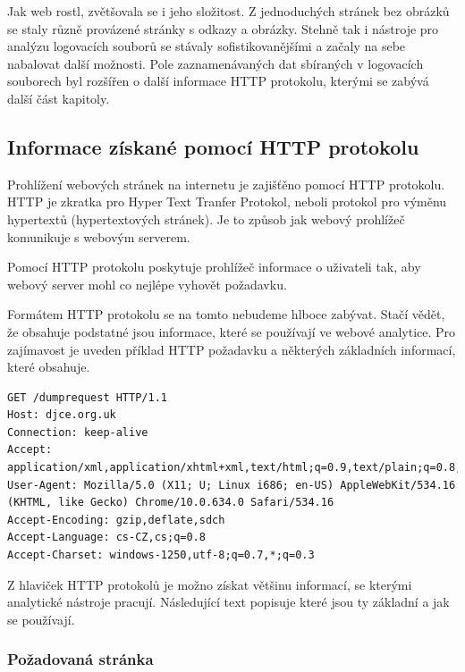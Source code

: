 \documentclass[bc,male,java,dept456]{diploma}						%
\begin{document}
Jak web rostl, zvětšovala se i jeho složitost. Z jednoduchých stránek bez obrázků se staly různě provázené stránky s odkazy a obrázky. Stehně tak i nástroje pro analýzu logovacích souborů se stávaly sofistikovanějšími a začaly na sebe nabalovat další možnosti. Pole zaznamenávaných dat sbíraných v logovacích souborech byl rozšířen o další informace HTTP protokolu, kterými se zabývá další část kapitoly.





  
\subsection{Informace získané pomocí HTTP protokolu}

Prohlížení webových stránek na internetu je zajišťěno pomocí HTTP protokolu. HTTP je zkratka pro Hyper Text Tranfer Protokol, neboli protokol pro výměnu hypertextů (hypertextových stránek). Je to způsob jak webový prohlížeč komunikuje s webovým serverem.

Pomocí HTTP protokolu poskytuje prohlížeč informace o uživateli tak, aby webový server mohl co nejlépe vyhovět požadavku.

Formátem HTTP protokolu se na tomto nebudeme hlboce zabývat. Stačí vědět, že obsahuje podstatné jsou informace, které se používají ve webové analytice. Pro zajímavost je uveden příklad HTTP požadavku a některých základních informací, které obsahuje.

\bigskip

\begin{lstlisting}[label=src:Plain,caption=Ukázka HTTP požadavku]
GET /dumprequest HTTP/1.1
Host: djce.org.uk
Connection: keep-alive
Accept: application/xml,application/xhtml+xml,text/html;q=0.9,text/plain;q=0.8,image/png,*/*;q=0.5
User-Agent: Mozilla/5.0 (X11; U; Linux i686; en-US) AppleWebKit/534.16 (KHTML, like Gecko) Chrome/10.0.634.0 Safari/534.16
Accept-Encoding: gzip,deflate,sdch
Accept-Language: cs-CZ,cs;q=0.8
Accept-Charset: windows-1250,utf-8;q=0.7,*;q=0.3
\end{lstlisting}

Z hlaviček HTTP protokolů je možno získat většinu informací, se kterými analytické nástroje pracují. Následující text popisuje které jsou ty základní a jak se používají.

\subsubsection{Požadovaná stránka}
\end{document}
